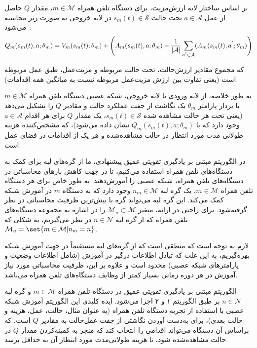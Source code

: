 بر اساس ساختار لایه ارزش‌مزیت، برای دستگاه تلفن همراه $m \in \mathcal{M}$، مقدار $Q$ حاصل از عمل $a \in \mathcal{A}$ تحت حالت $s_m(t) \in \mathcal{S}$ در لایه خروجی به صورت زیر محاسبه می‌شود~\cite{wang2016dueling}:
\begin{alignat}{2}
	Q_m(s_m(t),a;\theta_m) = V_m(s_m(t);\theta_m) + \Bigg( A_m(s_m(t),a;\theta_m) - {1 \over |\mathcal{A}|} \sum\limits_{a^{'} \in \mathcal{A}}(A_m(s_m(t),a^{'};\theta_m) \Bigg)
	\label{20}  
\end{alignat}

که مجموع مقادیر ارزش‌حالت، تحت حالت مربوطه و مزیت‌عمل، طبق عمل مربوطه است (یعنی تفاوت بین ارزش مزیت‌عمل مربوطه نسبت به میانگین همه اقدامات).

به طور خلاصه، از لایه ورودی تا لایه خروجی، شبکه عصبی دستگاه تلفن همراه $m \in \mathcal{M}$ با بردار پارامتر $\theta_m$ یک نگاشت از جفت عملکرد حالت و مقادیر $Q$ را تشکیل می‌دهد (یعنی تحت هر حالت مشاهده شده $s_m(t) \in \mathcal{S}$، یک مقدار $Q$ برای هر اقدام $a \in \mathcal{A}$ وجود دارد که با $Q_m(s_m(t),a;\theta_m)$ نشان داده می‌شود)، که مشخص‌کننده هزینه طولانی مدت مورد انتظار در حالت مشاهده‌شده و هر یک از اقدامات در فضای عمل است.






در الگوریتم مبتنی بر یادگیری تقویتی عمیق پیشنهادی، ما از گره‌های لبه برای کمک به دستگاه‌های تلفن همراه استفاده می‌کنیم، تا در جهت کاهش بارهای محاسباتی در دستگاه‌های تلفن همراه،  شبکه عصبی را آموزش‌دهند. به طور خاص برای هر دستگاه تلفن همراه $m \in \mathcal{M}$، یک گره لبه $n_m \in \mathcal{M}$ وجود دارد که به دستگاه $m$ در آموزش شبکه کمک می‌کند. این گره لبه می‌تواند گره‌ با بیش‌ترین ظرفیت محاسباتی در نظر گرفته‌شود. برای راحتی در ارائه، متغیر  $\mathcal{M}_n \subset \mathcal{M}$ را در اشاره به مجموعه دستگاه‌های تلفن همراه که از گره لبه $n \in \mathcal{N}$ در نظر می‌گیریم، به شکلی که $\mathcal{M}_n = \set{m \in \mathcal{M}|n_m = n}$.

لازم به توجه است که منطقی است که از گره‌های لبه مستقیماً در جهت آموزش شبکه بهره‌گیریم، به این علت که تبادل اطلاعات درگیر در آموزش (شامل اطلاعات وضعیت و پارامترهای شبکه عصبی) محدود است و علاوه بر این، ظرفیت محاسباتی مورد نیاز آموزش در هر دوره زمانی بسیار کمتر از وظایف دستگاه‌های تلفن همراه می‌باشد.

الگوریتم مبتنی بر یادگیری تقویتی عمیق در دستگاه تلفن همراه $m \in \mathcal{M}$ و گره لبه $n \in \mathcal{N}$ بر طبق الگوریتم ۱ و ۲ اجرا می‌شود. ایده کلیدی این الگوریتم آموزش شبکه عصبی با استفاده از تجربه دستگاه تلفن همراه (به عنوان مثال، حالت، عمل، هزینه و حالت بعدی)، برای به‌دست ‌آوردن نگاشتی از جفت عمل‌حالت به مقادیر $Q$ است، که براساس آن دستگاه می‌تواند اقدامی را انتخاب کند که منجر به کمینه‌کردن مقدار $Q$ در حالت مشاهده‌شده شود، تا هزینه طولانی‌مدت مورد انتظار آن به حداقل برسد.


